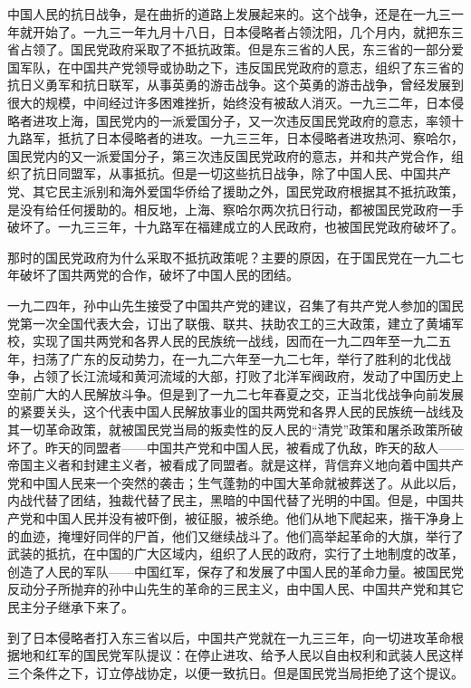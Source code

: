 中国人民的抗日战争，是在曲折的道路上发展起来的。这个战争，还是在一九三一年就开始了。一九三一年九月十八日，日本侵略者占领沈阳，几个月内，就把东三省占领了。国民党政府采取了不抵抗政策。但是东三省的人民，东三省的一部分爱国军队，在中国共产党领导或协助之下，违反国民党政府的意志，组织了东三省的抗日义勇军和抗日联军，从事英勇的游击战争。这个英勇的游击战争，曾经发展到很大的规模，中间经过许多困难挫折，始终没有被敌人消灭。一九三二年，日本侵略者进攻上海，国民党内的一派爱国分子，又一次违反国民党政府的意志，率领十九路军，抵抗了日本侵略者的进攻。一九三三年，日本侵略者进攻热河、察哈尔，国民党内的又一派爱国分子，第三次违反国民党政府的意志，并和共产党合作，组织了抗日同盟军，从事抵抗。但是一切这些抗日战争，除了中国人民、中国共产党、其它民主派别和海外爱国华侨给了援助之外，国民党政府根据其不抵抗政策，是没有给任何援助的。相反地，上海、察哈尔两次抗日行动，都被国民党政府一手破坏了。一九三三年，十九路军在福建成立的人民政府，也被国民党政府破坏了。

那时的国民党政府为什么采取不抵抗政策呢？主要的原因，在于国民党在一九二七年破坏了国共两党的合作，破坏了中国人民的团结。

一九二四年，孙中山先生接受了中国共产党的建议，召集了有共产党人参加的国民党第一次全国代表大会，订出了联俄、联共、扶助农工的三大政策，建立了黄埔军校，实现了国共两党和各界人民的民族统一战线，因而在一九二四年至一九二五年，扫荡了广东的反动势力，在一九二六年至一九二七年，举行了胜利的北伐战争，占领了长江流域和黄河流域的大部，打败了北洋军阀政府，发动了中国历史上空前广大的人民解放斗争。但是到了一九二七年春夏之交，正当北伐战争向前发展的紧要关头，这个代表中国人民解放事业的国共两党和各界人民的民族统一战线及其一切革命政策，就被国民党当局的叛卖性的反人民的“清党”政策和屠杀政策所破坏了。昨天的同盟者——中国共产党和中国人民，被看成了仇敌，昨天的敌人——帝国主义者和封建主义者，被看成了同盟者。就是这样，背信弃义地向着中国共产党和中国人民来一个突然的袭击；生气蓬勃的中国大革命就被葬送了。从此以后，内战代替了团结，独裁代替了民主，黑暗的中国代替了光明的中国。但是，中国共产党和中国人民并没有被吓倒，被征服，被杀绝。他们从地下爬起来，揩干净身上的血迹，掩埋好同伴的尸首，他们又继续战斗了。他们高举起革命的大旗，举行了武装的抵抗，在中国的广大区域内，组织了人民的政府，实行了土地制度的改革，创造了人民的军队——中国红军，保存了和发展了中国人民的革命力量。被国民党反动分子所抛弃的孙中山先生的革命的三民主义，由中国人民、中国共产党和其它民主分子继承下来了。

到了日本侵略者打入东三省以后，中国共产党就在一九三三年，向一切进攻革命根据地和红军的国民党军队提议：在停止进攻、给予人民以自由权利和武装人民这样三个条件之下，订立停战协定，以便一致抗日。但是国民党当局拒绝了这个提议。

